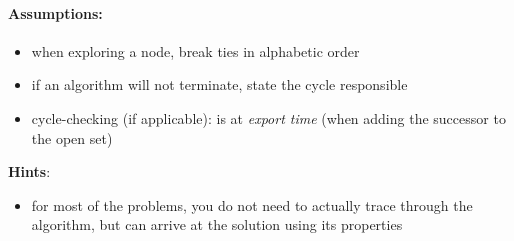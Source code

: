 \paragraph{Assumptions:}
\begin{itemize}
  \item when exploring a node, break ties in alphabetic order
  \item if an algorithm will not terminate, state the cycle responsible
  \item cycle-checking (if applicable): is at \emph{export time} (when adding the successor to the open set)
\end{itemize}
\textbf{Hints}:
\begin{itemize}
    \item for most of the problems, you do not need to actually trace through the algorithm, but can arrive at the solution using its properties
\end{itemize}

